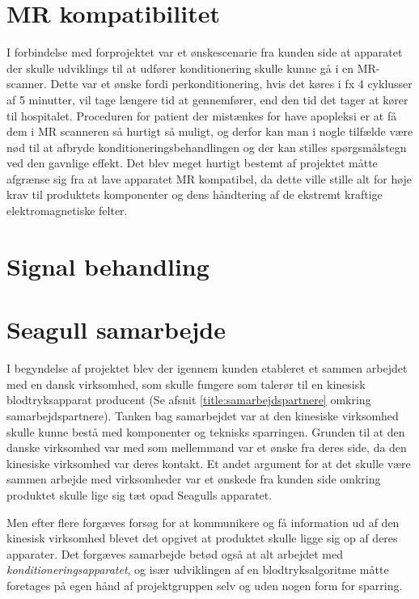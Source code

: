 \section{MR kompatibilitet}
I forbindelse med forprojektet var et ønskescenarie fra kunden side at apparatet der skulle udviklings til at udfører konditionering skulle kunne gå i en MR-scanner. Dette var et ønske fordi perkonditionering, hvis det køres i fx 4 cyklusser af 5 minutter, vil tage længere tid at gennemfører, end den tid det tager at kører til hospitalet. Proceduren for patient der mistænkes for have apopleksi er at få dem i MR scanneren så hurtigt så muligt, og derfor kan man i nogle tilfælde være nød til at afbryde konditioneringsbehandlingen og der kan stilles spørgsmålstegn ved den gavnlige effekt. Det blev meget hurtigt bestemt af projektet måtte afgrænse sig fra at lave apparatet MR kompatibel, da dette ville stille alt for høje krav til produktets komponenter og dens håndtering af de ekstremt kraftige elektromagnetiske felter.

\section{Signal behandling}

\section{Seagull samarbejde}
I begyndelse af projektet blev der igennem kunden etableret et sammen arbejdet med en dansk virksomhed, som skulle fungere som talerør til en kinesisk blodtryksapparat producent (Se afsnit \ref{title:samarbejdspartnere} omkring samarbejdspartnere). Tanken bag samarbejdet var at den kinesiske virksomhed skulle kunne bestå med komponenter og teknisks sparringen. Grunden til at den danske virksomhed var med som mellemmand var et ønske fra deres side, da den kinesiske virksomhed var deres kontakt. Et andet argument for at det skulle være sammen arbejde med virksomheder var et ønskede fra kunden side omkring produktet skulle lige sig tæt opad Seagulls apparatet. 

Men efter flere forgæves forsøg for at kommunikere og få information ud af den kinesisk virksomhed blevet det opgivet at produktet skulle ligge sig op af deres apparater. Det forgæves samarbejde betød også at alt arbejdet med \textit{konditioneringsapparatet}, og især udviklingen af en blodtryksalgoritme måtte foretages på egen hånd af projektgruppen selv og uden nogen form for sparring. 

